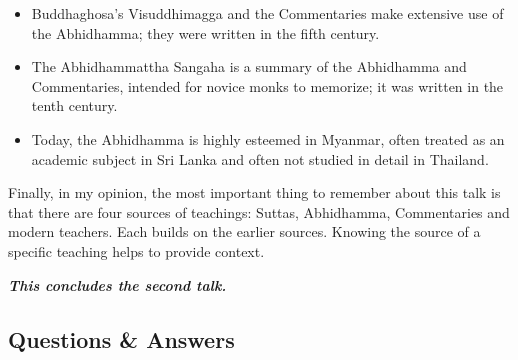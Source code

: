 \begin{itemize}
\begin{itemize}
\end{itemize}

\item Buddhaghosa’s Visuddhimagga and the Commentaries make extensive use of the Abhidhamma; they were written in the fifth century.

\item The Abhidhammattha Sangaha is a summary of the Abhidhamma and Commentaries, intended for novice monks to memorize; it was written in the tenth century.

\item Today, the Abhidhamma is highly esteemed in Myanmar, often treated as an academic subject in Sri Lanka and often not studied in detail in Thailand.

\end{itemize}

Finally, in my opinion, the most important thing to remember about this talk is that there are four sources of teachings: Suttas, Abhidhamma, Commentaries and modern teachers. Each builds on the earlier sources. Knowing the source of a specific teaching helps to provide context.

\begin{center}
\textbf{\textit{This concludes the second talk.}} \\
\end{center}

\newpage

\subsection*{Questions \& Answers}


